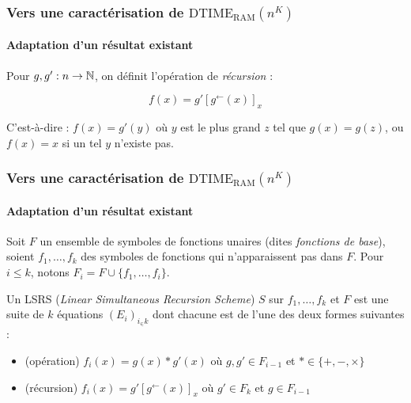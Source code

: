 \documentclass[10pt]{beamer}
\newcommand{\dtimeram}{\text{DTIME}_{\text{RAM}}\left( n^K \right)}
\newcommand{\eqpred}[3]{#1\left[ #2^{\leftarrow}(#3) \right]_{#3}}
\begin{document}
	\begin{frame}
		\frametitle{Vers une caractérisation de $\dtimeram$}
		\framesubtitle{Adaptation d'un résultat existant}
		
		\begin{defn}
			Pour $g, g' : n \to \mathbb{N}$, on définit l'opération de \emph{récursion} :
			
			\[
				f(x) = \eqpred{g'}{g}{x}
			\]
			
			C'est-à-dire : $f(x) = g'(y)$ où $y$ est le plus grand $z$ tel que $g(x) = g(z)$, ou $f(x) = x$ si un tel $y$ n'existe pas.
		\end{defn}
	\end{frame}
	
	\begin{frame}
		\frametitle{Vers une caractérisation de $\dtimeram$}
		\framesubtitle{Adaptation d'un résultat existant}
				
		\begin{defn}[LSRS]
			\label{def:LSRS}
			Soit $F$ un ensemble de symboles de fonctions unaires (dites \emph{fonctions de base}), soient $f_1, \dots, f_k$ des symboles de fonctions qui n'apparaissent pas dans $F$. Pour $i\leqslant k$, notons $F_i = F\cup \{f_1, \dots, f_i\}$. 
			
			Un LSRS (\emph{Linear Simultaneous Recursion Scheme}) $S$ sur $f_1, \dots, f_k$ et $F$ est une suite de $k$ équations $\left(E_i\right)_{i_\in k}$ dont chacune est de l'une des deux formes suivantes :
			
			\begin{itemize}
				\item 	(opération) 		$f_i(x) = g(x) * g'(x)$ où $g,g' \in F_{i-1}$ et $* \in \{+, -, \times \}$
				
				\item 	(récursion)			$f_i(x) = \eqpred{g'}{g}{x}$ où $g' \in F_k$ et $g \in F_{i-1}$
			\end{itemize}
			
		\end{defn}
	\end{frame}
	
\end{document}
